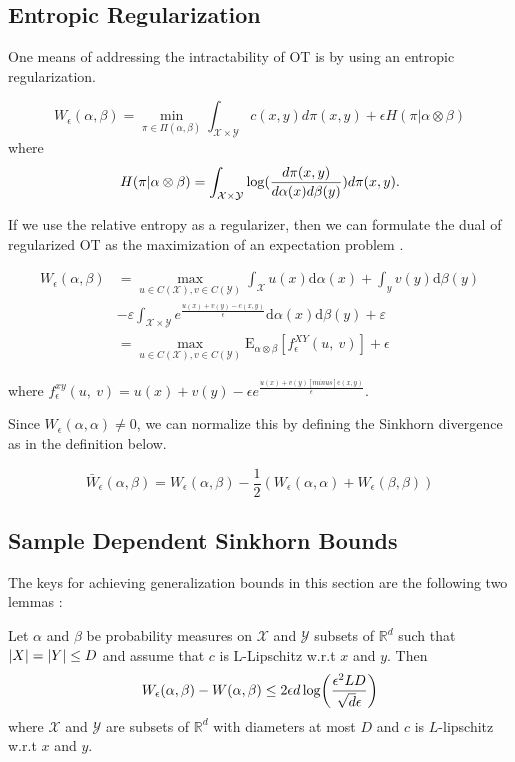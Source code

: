 \subsection{Entropic Regularization}

One means of addressing the intractability of OT is by using an entropic regularization.

\begin{definition}
	$$W_{\epsilon}(\alpha,\beta) = \min_{\pi \in \Pi(\alpha,\beta)} \int_{\mathcal{X}\times \mathcal{Y}} c(x,y)d\pi(x,y) + \epsilon H(\pi | \alpha \otimes \beta)$$
	where $$H(\pi | \alpha \otimes \beta) = \int_{\mathcal{X}\times \mathcal{Y}} \log (\frac{d\pi(x,y)}{d\alpha(x)d\beta(y)})d\pi(x,y).$$
\end{definition}

If we use the relative entropy as a regularizer, then we can formulate the dual of regularized OT as the maximization of an expectation problem \cite{Genevay2018}.

\begin{align*}
W_{\epsilon}(\alpha,\beta) &=\max_{u\in C(\mathcal{X}),v\in C(\mathcal{Y})}\int_{\mathcal{X}} u(x)\mathrm{d}\alpha(x)+\int_{y}v(y)\mathrm{d}\beta(y) \\
&-\varepsilon \int_{\mathcal{X}\times \mathcal{Y}} e^{\frac{u(x)+v(y)-c(x,y)}{\epsilon}}\mathrm{d}\alpha(x)\mathrm{d}\beta(y) + \varepsilon\\
&= \max_{u\in C(\mathcal{X}),v\in C(\mathcal{Y})} \mathrm{E}_{\alpha \otimes \beta} [f_{\epsilon}^{XY}(u,\ v)]+\epsilon
\end{align*}


where $f_{\epsilon}^{xy}(u,\ v)=u(x)+v(y)- \epsilon e^{\frac{u(x)+v(y)[minus]\mathrm{c}(x,y)}{\epsilon}}.$

Since $W_{\epsilon}(\alpha,\alpha)\neq 0$, we can normalize this by defining the Sinkhorn divergence as in the definition below.
\begin{definition}
\[
\bar{W}_{\epsilon}(\alpha,\beta)=W_{\epsilon}(\alpha,\beta)-\frac{1}{2}(W_{\epsilon}(\alpha,\alpha)+W_{\epsilon}(\beta,\beta))
\] 
\end{definition}

\subsection{Sample Dependent Sinkhorn Bounds}

The keys for achieving generalization bounds in this section are the following two lemmas \cite{Genevay2018}: 
\begin{lemma}
	\label{divergence_sinkhorn_from_wasserstein}
	Let $\alpha$ and $\beta$ be probability measures on $\mathcal{X}$ and $\mathcal{Y}$ subsets of $\mathbb{R}^d$ such that $\lvert X\rvert=\lvert Y\rvert\leq D$ and assume that $c$ is L-Lipschitz w.r.t $x$ and $y$. Then
	$$W_{\epsilon}(\alpha,\beta)-W(\alpha,\beta) \leq 2\epsilon d \log \paren*{\frac{\epsilon^2 L D}{\sqrt{d}\epsilon}}$$ where $\mathcal{X}$ and $\mathcal{Y}$ are subsets of $\mathbb{R}^d$ with diameters at most $D$ and $c$ is $L$-lipschitz w.r.t $x$ and $y$.
\end{lemma}

